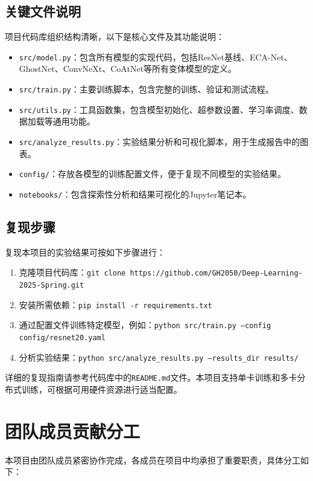 \documentclass[a4paper]{article}
\begin{document}
\subsection{关键文件说明}
项目代码库组织结构清晰，以下是核心文件及其功能说明：
\begin{itemize}
    \item \texttt{src/model.py}：包含所有模型的实现代码，包括ResNet基线、ECA-Net、GhostNet、ConvNeXt、CoAtNet等所有变体模型的定义。
    \item \texttt{src/train.py}：主要训练脚本，包含完整的训练、验证和测试流程。
    \item \texttt{src/utils.py}：工具函数集，包含模型初始化、超参数设置、学习率调度、数据加载等通用功能。
    \item \texttt{src/analyze\_results.py}：实验结果分析和可视化脚本，用于生成报告中的图表。
    \item \texttt{config/}：存放各模型的训练配置文件，便于复现不同模型的实验结果。
    \item \texttt{notebooks/}：包含探索性分析和结果可视化的Jupyter笔记本。
\end{itemize}

\subsection{复现步骤}
复现本项目的实验结果可按如下步骤进行：
\begin{enumerate}
    \item 克隆项目代码库：\texttt{git clone https://github.com/GH2050/Deep-Learning-2025-Spring.git}
    \item 安装所需依赖：\texttt{pip install -r requirements.txt}
    \item 通过配置文件训练特定模型，例如：\texttt{python src/train.py --config config/resnet20.yaml}
    \item 分析实验结果：\texttt{python src/analyze\_results.py --results\_dir results/}
\end{enumerate}

详细的复现指南请参考代码库中的\texttt{README.md}文件。本项目支持单卡训练和多卡分布式训练，可根据可用硬件资源进行适当配置。

\section{团队成员贡献分工}
\label{app:contributions}

本项目由团队成员紧密协作完成，各成员在项目中均承担了重要职责，具体分工如下：
\end{document}
